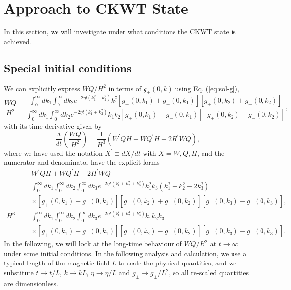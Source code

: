 \documentclass[english,aps,superscriptaddress,preprint]{revtex4-1}
\begin{document}
\section{Approach to CKWT State}

\label{sec:Approach-to-CKWT}In this section, we will investigate
under what conditions the CKWT state is achieved.

\subsection{Special initial conditions}

We can explicitly express $WQ/H^{2}$ in terms of $g_{\pm}(0,k)$
using Eq. (\ref{eq:sol-g}), 
\begin{equation}
\frac{WQ}{H^{2}}=\frac{\int_{0}^{\infty}dk_{1}\int_{0}^{\infty}dk_{2}e^{-2\eta t(k_{1}^{2}+k_{2}^{2})}k_{1}^{2}\left[g_{+}(0,k_{1})+g_{-}(0,k_{1})\right]\left[g_{+}(0,k_{2})+g_{-}(0,k_{2})\right]}{\int_{0}^{\infty}dk_{1}\int_{0}^{\infty}dk_{2}e^{-2\eta t(k_{1}^{2}+k_{2}^{2})}k_{1}k_{2}\left[g_{+}(0,k_{1})-g_{-}(0,k_{1})\right]\left[g_{+}(0,k_{2})-g_{-}(0,k_{2})\right]},
\end{equation}
with its time derivative given by 
\begin{equation}
\frac{d}{dt}\left(\frac{WQ}{H^{2}}\right)=\frac{1}{H^{3}}\left(W^{\prime}QH+WQ^{\prime}H-2H^{\prime}WQ\right),
\end{equation}
where we have used the notation $X^{\prime}\equiv dX/dt$ with $X=W,Q,H$,
and the numerator and denominator have the explicit forms 
\begin{eqnarray}
 &  & W^{\prime}QH+WQ^{\prime}H-2H^{\prime}WQ\nonumber \\
 & = & \int_{0}^{\infty}dk_{1}\int_{0}^{\infty}dk_{2}\int_{0}^{\infty}dk_{3}e^{-2\eta t(k_{1}^{2}+k_{2}^{2}+k_{3}^{2})}k_{1}^{2}k_{3}\left(k_{1}^{2}+k_{2}^{2}-2k_{3}^{2}\right)\nonumber \\
 &  & \times\left[g_{+}(0,k_{1})+g_{-}(0,k_{1})\right]\left[g_{+}(0,k_{2})+g_{-}(0,k_{2})\right]\left[g_{+}(0,k_{3})-g_{-}(0,k_{3})\right],\nonumber \\
H^{3} & = & \int_{0}^{\infty}dk_{1}\int_{0}^{\infty}dk_{2}\int_{0}^{\infty}dk_{3}e^{-2\eta t(k_{1}^{2}+k_{2}^{2}+k_{3}^{2})}k_{1}k_{2}k_{3}\nonumber \\
 &  & \times\left[g_{+}(0,k_{1})-g_{-}(0,k_{1})\right]\left[g_{+}(0,k_{2})-g_{-}(0,k_{2})\right]\left[g_{+}(0,k_{3})-g_{-}(0,k_{3})\right].
\end{eqnarray}
In the following, we will look at the long-time behaviour of $WQ/H^{2}$
at $t\rightarrow\infty$ under some initial conditions. In the following
analysis and calculation, we use a typical length of the magnetic
field $L$ to scale the physical quantities, and we substitute $t\rightarrow t/L$,
$k\rightarrow kL$, $\eta\rightarrow\eta/L$ and $g_{\pm}\rightarrow g_{\pm}/L^{2}$,
so all re-scaled quantities are dimensionless.
\end{document}
